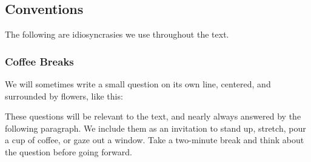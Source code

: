 \documentclass{article}
\begin{document}
\subsection*{Conventions}

The following are idiosyncrasies we use throughout the text.

\subsubsection*{Coffee Breaks}

We will sometimes write a small question on its own line, centered, and surrounded by flowers, like this:


These questions will be relevant to the text, and nearly always answered by the following paragraph.
We include them as an invitation to stand up, stretch, pour a cup of coffee, or gaze out a window.
Take a two-minute break and think about the question before going forward.
\end{document}
